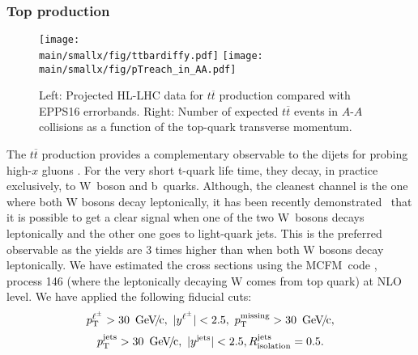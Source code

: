 \documentclass[../report.tex]{subfiles}
\providecommand{\main}{..}
\begin{document}
\subsubsection{Top production}
\label{sec:nPDF_top}

\begin{figure}[htb!]
\centering
\texttt{[image: \\main/smallx/fig/ttbardiffy.pdf]}
\texttt{[image: \\main/smallx/fig/pTreach\_in\_AA.pdf]}
\caption{Left: Projected HL-LHC data for $t\overline{t}$ production compared with EPPS16 errorbands. Right: Number of expected $t\overline{t}$ events in $A$-$A$ collisions as a function of the top-quark transverse momentum.}
\label{fig:ttbardiffy}
\end{figure}

The $t\overline{t}$ production provides a complementary observable to the dijets for probing high-$x$ gluons \cite{dEnterria:2015mgr,Sirunyan:2017xku}. For the very short t-quark life time, they decay, in practice exclusively, to W~boson and b~quarks. Although, the cleanest channel is the one where both W bosons decay leptonically, it has been recently demonstrated~\cite{Sirunyan:2017xku} that it is possible to get a clear signal when one of the two W~bosons decays leptonically and the other one goes to light-quark jets. This is the preferred observable as the yields are 3 times higher than when both W bosons decay leptonically. We have estimated the cross sections using the MCFM~code \cite{Campbell:2015qma}, process 146 (where the leptonically decaying W comes from top quark) at NLO level. We have applied the following fiducial cuts:
$$ \pT^{\ell^\pm} > 30 \, {\rm \UGeVc}, \ |y^{\ell^\pm}| < 2.5, \ \pT^{\rm missing} > 30 \, {\rm \UGeVc}, $$
$$ p\sb{\scriptstyle\mathrm{T}}^{\rm jets} > 30 \, {\rm ~\text{GeV}\!/\mspace{-2mu}c}, \ |y^{\rm jets}| < 2.5, R_{\rm isolation}^{\rm jets} = 0.5. $$
\end{document}
